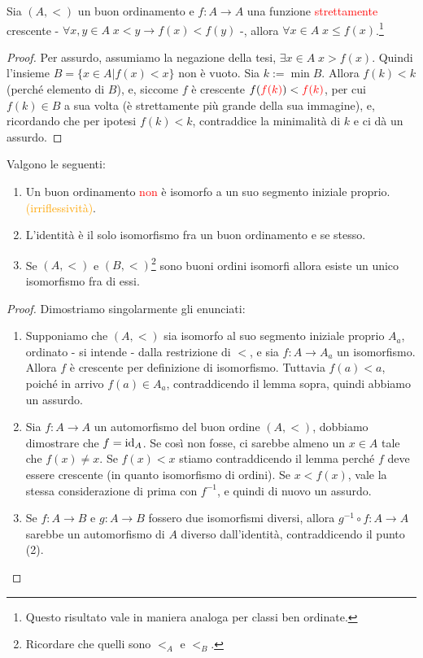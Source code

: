 \begin{lemma}
	Sia $(A,<)$ un buon ordinamento e $f : A \rightarrow A$ una funzione \textcolor{red}{strettamente} crescente - $\forall x,y \in A \; x < y \rightarrow f(x) < f(y)$ -, allora $\forall x \in A \; x \leq f(x)$.\footnote{Questo risultato vale in maniera analoga per classi ben ordinate.}
\end{lemma}

\begin{proof}
	Per assurdo, assumiamo la negazione della tesi, $\exists x \in A \; x > f(x)$. Quindi l'insieme $B = \{x \in A | f(x) < x\}$ non è vuoto. Sia $k := \min B$.
	Allora $f(k) < k$ (perché elemento di $B$), e, siccome $f$ è crescente $f(\textcolor{red}{f(k)}) < \textcolor{red}{f(k)}$, per cui $f(k) \in B$ a sua volta (è strettamente più grande della sua immagine),
	e, ricordando che per ipotesi $f(k)<k$, contraddice la minimalità di $k$ e ci dà un assurdo.
\end{proof}

\begin{corollary}
	Valgono le seguenti:
	\begin{enumerate}[(1)]
		\item Un buon ordinamento \textcolor{red}{non} è isomorfo a un suo segmento iniziale proprio. \textcolor{orange}{(irriflessività)}.
		\item L'identità è il solo isomorfismo fra un buon ordinamento e se stesso.
		\item Se $(A,<)$ e $(B,<)$\footnote{Ricordare che quelli sono $<_A$ e $<_B$.} sono buoni ordini isomorfi allora esiste un unico isomorfismo fra di essi.
	\end{enumerate}
\end{corollary}

\begin{proof}
	Dimostriamo singolarmente gli enunciati:
	\begin{enumerate}[(1)]
		\item Supponiamo che $(A,<)$ sia isomorfo al suo segmento iniziale proprio $A_a$, ordinato - si intende - dalla restrizione di $<$, e sia $f : A \rightarrow A_a$ un isomorfismo.
		Allora $f$ è crescente per definizione di isomorfismo. Tuttavia $f(a) < a$, poiché in arrivo $f(a) \in A_a$, contraddicendo il lemma sopra, quindi abbiamo un assurdo.
		\item Sia $f : A \rightarrow A$ un automorfismo del buon ordine $(A,<)$, dobbiamo dimostrare che $f = \operatorname{id}_A$. Se così non fosse, ci sarebbe almeno un $x \in A$ tale che $f(x) \ne x$.
		Se $f(x) < x$ stiamo contraddicendo il lemma perché $f$ deve essere crescente (in quanto isomorfismo di ordini). Se $x < f(x)$, vale la stessa considerazione di prima con $f^{-1}$, e quindi di nuovo un assurdo.
		\item Se $f : A \rightarrow B$ e $g : A \rightarrow B$ fossero due isomorfismi diversi, allora $g^{-1} \circ f : A \rightarrow A$ sarebbe un automorfismo di $A$ diverso dall'identità,
		contraddicendo il punto (2).	
	\end{enumerate}
\end{proof}

